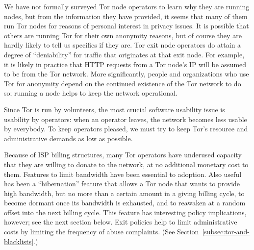 \documentclass{llncs}
\begin{document}
We have not formally surveyed Tor node operators to learn why they are
running nodes, but
from the information they have provided, it seems that many of them run Tor
nodes for reasons of personal interest in privacy issues.  It is possible
that others are running Tor for their own
anonymity reasons, but of course they are
hardly likely to tell us specifics if they are.
%
Tor exit node operators do attain a degree of
``deniability'' for traffic that originates at that exit node.  For
  example, it is likely in practice that HTTP requests from a Tor node's IP
  will be assumed to be from the Tor network. 
  More significantly, people and organizations who use Tor for
  anonymity depend on the
  continued existence of the Tor network to do so; running a node helps to
  keep the network operational.


Since Tor is run by volunteers, the most crucial software usability issue is
usability by operators: when an operator leaves, the network becomes less
usable by everybody.  To keep operators pleased, we must try to keep Tor's
resource and administrative demands as low as possible.

Because of ISP billing structures, many Tor operators have underused capacity
that they are willing to donate to the network, at no additional monetary
cost to them.  Features to limit bandwidth have been essential to adoption.
Also useful has been a ``hibernation'' feature that allows a Tor node that
wants to provide high bandwidth, but no more than a certain amount in a
giving billing cycle, to become dormant once its bandwidth is exhausted, and
to reawaken at a random offset into the next billing cycle.  This feature has
interesting policy implications, however; see
the next section below.
Exit policies help to limit administrative costs by limiting the frequency of
abuse complaints. (See Section~\ref{subsec:tor-and-blacklists}.)
\end{document}
